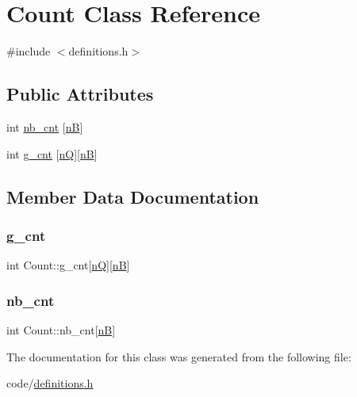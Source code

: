\hypertarget{classCount}{}\section{Count Class Reference}
\label{classCount}


{\ttfamily \#include $<$definitions.\+h$>$}

\subsection*{Public Attributes}
\begin{DoxyCompactItemize}
\item 
int \hyperlink{classCount_afca50b2ee78bfd81fbe2be6fd93d5cd4}{nb\+\_\+cnt} \mbox{[}\hyperlink{NarrowBand_8h_aca13f491975ccaa9a165708a85753bda}{nB}\mbox{]}
\item 
int \hyperlink{classCount_a17051e627b397cbb20bda0648aee6bcc}{g\+\_\+cnt} \mbox{[}\hyperlink{NarrowBand_8h_ac207cb86a4c7e5bc1973837ee2339e59}{nQ}\mbox{]}\mbox{[}\hyperlink{NarrowBand_8h_aca13f491975ccaa9a165708a85753bda}{nB}\mbox{]}
\end{DoxyCompactItemize}


\subsection{Member Data Documentation}
\mbox{\label{classCount_a17051e627b397cbb20bda0648aee6bcc}} 
\subsubsection{\texorpdfstring{g\+\_\+cnt}{g\_cnt}}
{\footnotesize\ttfamily int Count\+::g\+\_\+cnt\mbox{[}\hyperlink{NarrowBand_8h_ac207cb86a4c7e5bc1973837ee2339e59}{nQ}\mbox{]}\mbox{[}\hyperlink{NarrowBand_8h_aca13f491975ccaa9a165708a85753bda}{nB}\mbox{]}}

\mbox{\label{classCount_afca50b2ee78bfd81fbe2be6fd93d5cd4}} 
\subsubsection{\texorpdfstring{nb\+\_\+cnt}{nb\_cnt}}
{\footnotesize\ttfamily int Count\+::nb\+\_\+cnt\mbox{[}\hyperlink{NarrowBand_8h_aca13f491975ccaa9a165708a85753bda}{nB}\mbox{]}}



The documentation for this class was generated from the following file\+:\begin{DoxyCompactItemize}
\item 
code/\hyperlink{definitions_8h}{definitions.\+h}\end{DoxyCompactItemize}
